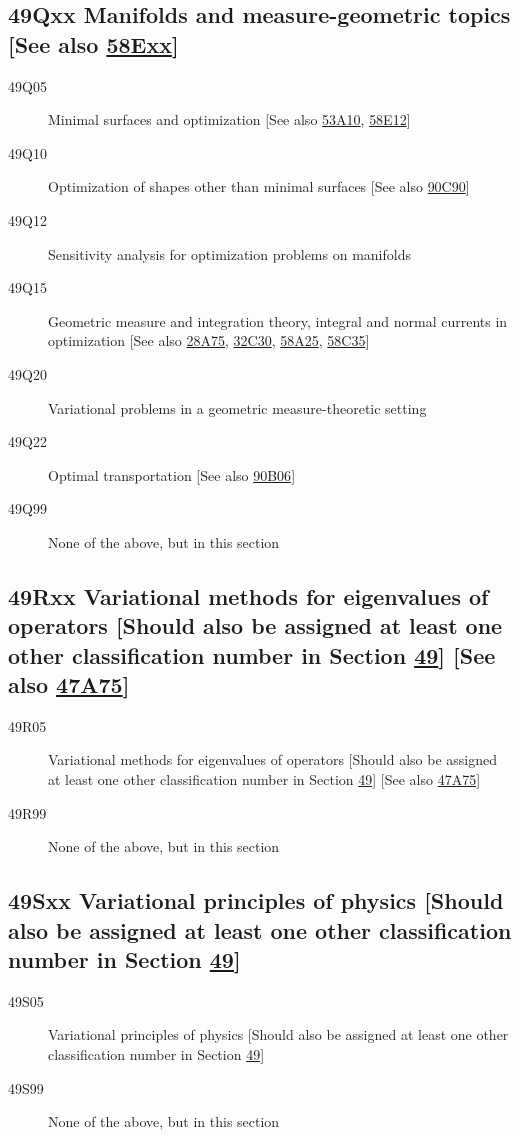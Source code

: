 \subsection*{49Qxx Manifolds and measure-geometric topics [See also \hyperref[58Exx]{58Exx}]}\label{49Qxx}
\begin{description}
\item [49Q05]\label{49Q05} Minimal surfaces and optimization [See also \hyperref[53A10]{53A10}, \hyperref[58E12]{58E12}]
\item [49Q10]\label{49Q10} Optimization of shapes other than minimal surfaces [See also \hyperref[90C90]{90C90}]
\item [49Q12]\label{49Q12} Sensitivity analysis for optimization problems on manifolds
\item [49Q15]\label{49Q15} Geometric measure and integration theory, integral and normal currents in optimization [See also \hyperref[28A75]{28A75}, \hyperref[32C30]{32C30}, \hyperref[58A25]{58A25}, \hyperref[58C35]{58C35}]
\item [49Q20]\label{49Q20} Variational problems in a geometric measure-theoretic setting
\item [49Q22]\label{49Q22} Optimal transportation [See also \hyperref[90B06]{90B06}]
\item [49Q99]\label{49Q99} None of the above, but in this section
\end{description}
\subsection*{49Rxx  Variational methods for eigenvalues of operators [Should also be assigned at least one other classification number in Section \hyperref[49-XX]{49}] [See also \hyperref[47A75]{47A75}] }\label{49Rxx}
\begin{description}  
\item [49R05]\label{49R05} Variational methods for eigenvalues of operators [Should also be assigned at least one other classification number in Section \hyperref[49-XX]{49}] [See also \hyperref[47A75]{47A75}]
\item [49R99]\label{49R99} None of the above, but in this section
\end{description}
\subsection*{49Sxx  Variational principles of physics [Should also be assigned at least one other classification number in Section \hyperref[49-XX]{49}] }\label{49Sxx}
\begin{description}  
\item [49S05]\label{49S05} Variational principles of physics [Should also be assigned at least one other classification number in Section \hyperref[49-XX]{49}]
\item [49S99]\label{49S99} None of the above, but in this section
\end{description}
